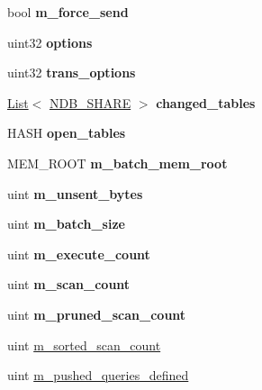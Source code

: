 \begin{DoxyCompactItemize}
bool {\bfseries m\+\_\+force\+\_\+send}
\item 
\mbox{\label{classThd__ndb_a39323722f2164f59f75cddfbd8701e72}} 
uint32 {\bfseries options}
\item 
\mbox{\label{classThd__ndb_af3a976c255a7c95f876a5be071d0757a}} 
uint32 {\bfseries trans\+\_\+options}
\item 
\mbox{\label{classThd__ndb_a26ba14a441b21b867c501035490aad6c}} 
\mbox{\hyperlink{classList}{List}}$<$ \mbox{\hyperlink{structNDB__SHARE}{N\+D\+B\+\_\+\+S\+H\+A\+RE}} $>$ {\bfseries changed\+\_\+tables}
\item 
\mbox{\label{classThd__ndb_afb055b4c711eb9395edadf736fe69f7d}} 
H\+A\+SH {\bfseries open\+\_\+tables}
\item 
\mbox{\label{classThd__ndb_a8598f26fde6fcca8895dd091fa4578ef}} 
M\+E\+M\+\_\+\+R\+O\+OT {\bfseries m\+\_\+batch\+\_\+mem\+\_\+root}
\item 
\mbox{\label{classThd__ndb_a4b65b91606931393cbb29d93bfcbc726}} 
uint {\bfseries m\+\_\+unsent\+\_\+bytes}
\item 
\mbox{\label{classThd__ndb_a1f7bab1cb4768a0d78e72c67c02da283}} 
uint {\bfseries m\+\_\+batch\+\_\+size}
\item 
\mbox{\label{classThd__ndb_a411d895fcd769924086073b19b54aca6}} 
uint {\bfseries m\+\_\+execute\+\_\+count}
\item 
\mbox{\label{classThd__ndb_af85dbb6989f35d0ac5c0d14c8392c76a}} 
uint {\bfseries m\+\_\+scan\+\_\+count}
\item 
\mbox{\label{classThd__ndb_a37ebd3fc9c955ab5a139f6a33a3c4e08}} 
uint {\bfseries m\+\_\+pruned\+\_\+scan\+\_\+count}
\item 
uint \mbox{\hyperlink{classThd__ndb_ae80017f1707f6464befa42e3e36e5986}{m\+\_\+sorted\+\_\+scan\+\_\+count}}
\item 
uint \mbox{\hyperlink{classThd__ndb_a99bf12f11431f7c8131a4a652d14078e}{m\+\_\+pushed\+\_\+queries\+\_\+defined}}

\end{DoxyCompactItemize}
